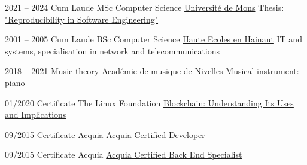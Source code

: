 
\begin{minipage}[t]{.48\textwidth}

    \begin{entrylist}
		\entry
			{\tiny{2021 -- 2024}}
            {Cum Laude}
			{MSc Computer Science}
            {\href{https://www.umons.be/}{Université de Mons}}
			{Thesis: \href{https://doi.org/10.5281/zenodo.12666898}{"Reproducibility in Software Engineering"}}
	\end{entrylist}

	\begin{entrylist}
		\entry
			{\tiny{2001 -- 2005}}
            {Cum Laude}
			{BSc Computer Science}
            {\href{https://www.heh.be/}{Haute Ecoles en Hainaut}}
			{IT and systems, specialisation in network and telecommunications}
	\end{entrylist}

	\begin{entrylist}
		\entry
			{\tiny{2018 -- 2021}}
            {}
			{Music theory}
            {\href{https://academiedenivelles.be/}{Académie de musique de Nivelles}}
			{Musical instrument: piano}
	\end{entrylist}
\end{minipage}
\hfill
\begin{minipage}[t]{.48\textwidth}
	\cvsect{Certificates}

	\begin{entrylist}
		\entry
			{01/2020}
            {}
			{Certificate}
			{The Linux Foundation}
			{\href{https://courses.edx.org/certificates/01fdb9d9242546e8bc45153468dfd785}{Blockchain: Understanding Its Uses and Implications}}
	\end{entrylist}

	\begin{entrylist}
		\entry
			{09/2015}
            {}
			{Certificate}
			{Acquia}
			{\href{https://certification.acquia.com/user/249}{Acquia Certified Developer}}
	\end{entrylist}

	\begin{entrylist}
		\entry
			{09/2015}
            {}
			{Certificate}
			{Acquia}
			{\href{https://certification.acquia.com/user/249}{Acquia Certified Back End Specialist}}
	\end{entrylist}
\end{minipage}


